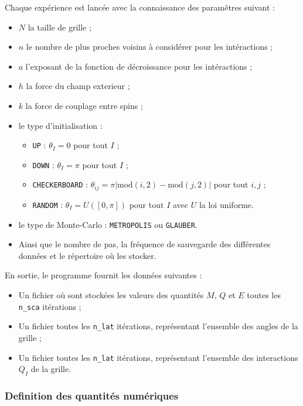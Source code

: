 \documentclass[a4paper, openany, 11pt]{article}
\begin{document}
Chaque expérience est lancée avec la connaissance des paramêtres suivant :
\begin{itemize}
    \item $N$ la taille de grille ;
    \item $n$ le nombre de plus proches voisins à considérer pour les intéractions ;
    \item $a$ l'exposant de la fonction de décroissance pour les intéractions ;
    \item $h$ la force du champ exterieur ;
    \item $k$ la force de couplage entre spins ;
    \item le type d'initialisation :
        \begin{itemize}
            \item \texttt{UP} : $\theta_{I}=0$ pour tout $I$ ;
            \item \texttt{DOWN} : $\theta_{I}=\pi$ pour tout $I$ ;
            \item \texttt{CHECKERBOARD} : $\theta_{ij}=\pi |\mathrm{mod}(i,2)-\mathrm{mod}(j, 2)|$ pour tout $i, j$ ;
            \item \texttt{RANDOM} : $\theta_{I}= U([0, \pi])$ pour tout $I$ avec $U$ la loi
                uniforme. 
        \end{itemize}
    \item le type de Monte-Carlo : \texttt{METROPOLIS}  ou \texttt{GLAUBER}.
    \item Ainsi que le nombre de pas, la fréquence de sauvegarde des différentes données et le
        répertoire où les stocker.
\end{itemize}
En sortie, le programme fournit les données suivantes :
\begin{itemize}
    \item Un fichier où sont stockées les valeurs des quantités $M$, $Q$ et $E$ toutes les
        \texttt{n\_sca} itérations ; 
    \item Un fichier toutes les \texttt{n\_lat} itérations, représentant l'ensemble des angles de la
        grille ; 
    \item Un fichier toutes les \texttt{n\_lat} itérations, représentant l'ensemble des interactions
        $Q_I$ de la grille.
\end{itemize}

\subsubsection{Definition des quantités numériques}
\end{document}
